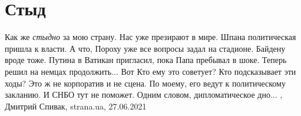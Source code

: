  
 
 
 
 
\chapter{Стыд}
\label{sec:slova.styd}

Как же \emph{стыдно} за мою страну. Нас уже презирают в мире. Шпана политическая
пришла к власти.  А что, Пороху уже все вопросы задал на стадионе. Байдену
вроде тоже. Путина в Ватикан пригласил, пока Папа пребывал в шоке. Теперь решил
на немцах продолжить...  Вот Кто ему это советует? Кто подсказывает эти ходы?
Это ж не корпоратив и не сцена. По моему, его ведут к политическому закланию. И
СНБО тут не поможет.  Одним словом, дипломатическое дно...
, 
Дмитрий Спивак, strana.ua, 27.06.2021
